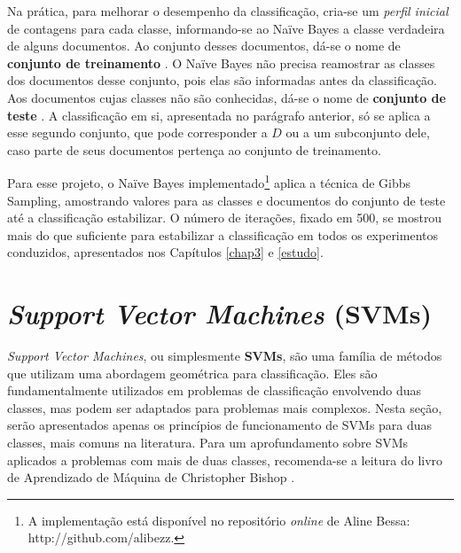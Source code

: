 Na prática, para melhorar o desempenho da classificação, cria-se um \emph{perfil inicial} de contagens para cada classe, informando-se ao Naïve Bayes a classe verdadeira de alguns documentos. Ao conjunto desses documentos, dá-se o nome de \textbf{conjunto de treinamento} \cite{bishop}. O Naïve Bayes não precisa reamostrar as classes dos documentos desse conjunto, pois elas são informadas antes da classificação. Aos documentos cujas classes não são conhecidas, dá-se o nome de \textbf{conjunto de teste} \cite{bishop}. A classificação em si, apresentada no parágrafo anterior, só se aplica a esse segundo conjunto, que pode corresponder a \ensuremath{D} ou a um subconjunto dele, caso parte de seus documentos pertença ao conjunto de treinamento.

Para esse projeto, o Naïve Bayes implementado\footnote{A implementação está disponível no repositório \emph{online} de Aline Bessa: http://github.com/alibezz.} aplica a técnica de Gibbs Sampling, amostrando valores para as classes e documentos do conjunto de teste até a classificação estabilizar. O número de iterações, fixado em 500, se mostrou mais do que suficiente para estabilizar a classificação em todos os experimentos conduzidos, apresentados nos Capítulos \ref{chap3} e \ref{estudo}. 

 

\section{\emph{Support Vector Machines} (SVMs)}
\label{subsection:SVMs}

\emph{Support Vector Machines}, ou simplesmente \textbf{SVMs}, são uma família de métodos que utilizam uma abordagem geométrica para classificação. Eles são fundamentalmente utilizados em problemas de classificação envolvendo duas classes, mas podem ser adaptados para problemas mais complexos. Nesta seção, serão apresentados apenas os princípios de funcionamento de SVMs para duas classes, mais comuns na literatura. Para um aprofundamento sobre SVMs aplicados a problemas com mais de duas classes, recomenda-se a leitura do livro de Aprendizado de Máquina de Christopher Bishop \cite{bishop}.

